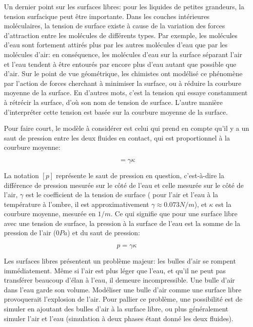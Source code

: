 \documentclass[11pt]{report}
\begin{document}
Un dernier point sur les surfaces libres: pour les liquides de petites grandeurs, la tension surfacique peut être importante. Dans les couches intérieures moléculaires, la tension de surface existe à cause de la variation des forces d'attraction entre les molécules de différents types. Par exemple, les molécules d'eau sont fortement attirés  plus par les autres molécules d'eau que par les molécules d'air: en conséquence, les molécules d'eau sur la surface séparant l'air et l'eau tendent à être entourés par encore plus d'eau autant que possible que d'air. Sur le point de vue géométrique, les chimistes ont modélisé ce phénomène par l'action de forces cherchant à minimiser la surface, ou à réduire la courbure moyenne de la surface. En d'autres mots, c'est la tension qui essaye constamment à rétrécir la surface, d'où son nom de tension de surface. L'autre manière d'interpréter cette tension est basée sur la courbure moyenne de la surface.\newline

Pour faire court, le modèle à considérer est celui qui prend en compte qu'il y a un saut de pression entre les deux fluides en contact, qui est proportionnel à la courbure moyenne:

\begin{equation}
[p] = \gamma \kappa
\end{equation}

La notation $ [p] $ représente le saut de pression en question, c'est-à-dire la différence de pression mesurée sur le côté de l'eau et celle mesurée sur le côté de l'air, $ \gamma $ est le coefficient de la tension de surface ( pour l'air et l'eau à la température à l'ombre, il est approximativement $ \gamma \approx 0.073 N/m $), et $ \kappa $ est la courbure moyenne, mesurée en $ 1/m $. Ce qui signifie que pour une surface libre avec une tension de surface, la pression à la surface de l'eau est la somme  de la pression de l'air ($0 Pa$) et du saut de pression:

\begin{equation}
p = \gamma \kappa
\end{equation}

Les surfaces libres présentent un problème majeur: les bulles d'air se rompent immédiatement. Même si l'air est plus léger que l'eau, et qu'il ne peut pas transférer beaucoup d'élan à l'eau, il demeure incompressible. Une bulle d'air dans l'eau garde son volume. Modéliser une bulle d'air comme une surface libre provoquerait l'explosion de l'air. Pour pallier ce problème, une possibilité est de simuler en ajoutant des bulles d'air à la surface libre, ou plus généralement simuler l'air et l'eau (simulation à deux phases étant donné les deux fluides).
\end{document}
